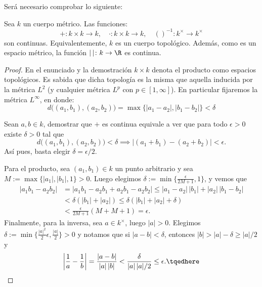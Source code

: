 \documentclass[teoria-numeros.tex]{subfiles}
\begin{document}
Será necesario comprobar lo siguiente:
\begin{thm}
	Sea $k$ un cuerpo métrico.
	Las funciones:
	$$ +\colon k\times k \to k, \quad \cdot\colon k\times k \to k, \quad ()^{-1} \colon k^\times \to k^\times $$
	son continuas.
	Equivalentemente, $k$ es un cuerpo topológico.
	Además, como es un espacio métrico, la función $|\,|\colon k \to \R$ es continua.
\end{thm}
\begin{proof}
	En el enunciado y la demostración $k\times k$ denota el producto como espacios topológicos.
	Es sabida que dicha topología es la misma que aquella inducida por la métrica $L^2$ (y cualquier métrica $L^p$ con $p \in [1, \infty]$).
	En particular fijaremos la métrica $L^\infty$, en donde:
	$$ d\big( (a_1, b_1), (a_2, b_2) \big) = \max\{ |a_1 - a_2|, |b_1 - b_2| \} < \delta $$

	Sean $a, b \in k$, demostrar que $+$ es continua equivale a ver que para todo $\epsilon > 0$ existe $\delta > 0$ tal que
	$$ d\big( (a_1, b_1), (a_2, b_2) \big) < \delta \implies |(a_1 + b_1) - (a_2 + b_2)| < \epsilon. $$
	Así pues, basta elegir $\delta = \epsilon/2$.

	Para el producto, sea $(a_1, b_1) \in k$ un punto arbitrario y sea $M := \max\{ |a_1|, |b_1|, 1 \} > 0$.
	Luego elegimos $\delta := \min\{ \frac{\epsilon}{2M + 1}, 1 \}$, y vemos que
	\begin{align*}
		| a_1 b_1 - a_2 b_2 | &= | a_1b_1 - a_2b_1 + a_2b_1 - a_2b_2 | \le |a_1 - a_2| \, |b_1| + |a_2| \, |b_1 - b_2| \\
				      &< \delta( |b_1| + |a_2| ) \le \delta( |b_1| + |a_2| + \delta ) \\
				      &< \frac{\epsilon}{2M + 1}(M + M + 1) = \epsilon.
	\end{align*}
	Finalmente, para la inversa, sea $a \in k^\times$, luego $|a| > 0$. Elegimos $\delta := \min \{ \frac{|a|^2}{2}\epsilon, \frac{|a|}{2} \} > 0$ y
	notamos que si $|a - b| < \delta$, entonces $|b| > |a| - \delta \ge |a|/2$ y
	\begin{equation}
		\left| \frac{1}{a} - \frac{1}{b} \right| = \frac{|a - b|}{|a| \, |b|} < \frac{\delta}{|a|\, |a|/2} \le \epsilon.
		\tqedhere
	\end{equation}
\end{proof}
\end{document}
